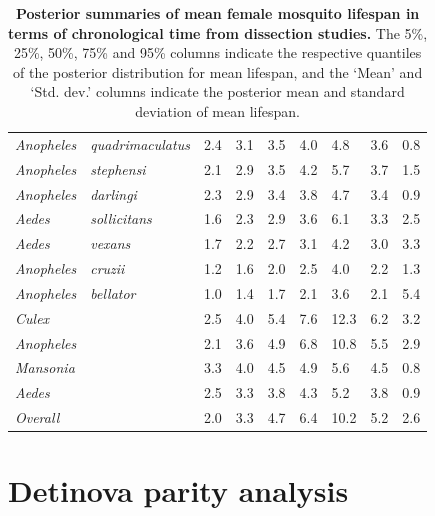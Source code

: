 \documentclass[12pt]{article}
\begin{document}
\begin{table}[htbp!]
\begin{tabular}{l|l|l|l|l|l|l|l|l}
	\textit{Anopheles} & \textit{quadrimaculatus} & 2.4 & 3.1 & 3.5 & 4.0 & 4.8 & 3.6 & 0.8 \\
	\textit{Anopheles} & \textit{stephensi} & 2.1 & 2.9 & 3.5 & 4.2 & 5.7 & 3.7 & 1.5 \\
	\textit{Anopheles} & \textit{darlingi} & 2.3 & 2.9 & 3.4 & 3.8 & 4.7 & 3.4 & 0.9 \\
	\textit{Aedes} & \textit{sollicitans} & 1.6 & 2.3 & 2.9 & 3.6 & 6.1 & 3.3 & 2.5 \\
	\textit{Aedes} & \textit{vexans} & 1.7 & 2.2 & 2.7 & 3.1 & 4.2 & 3.0 & 3.3 \\
	\textit{Anopheles} & \textit{cruzii} & 1.2 & 1.6 & 2.0 & 2.5 & 4.0 & 2.2 & 1.3 \\
	\textit{Anopheles} & \textit{bellator} & 1.0 & 1.4 & 1.7 & 2.1 & 3.6 & 2.1 & 5.4 \\
		\hline
		\textit{Culex} & \textit{} & 2.5 & 4.0 & 5.4 & 7.6 & 12.3 & 6.2 & 3.2 \\
		\textit{Anopheles} & \textit{} & 2.1 & 3.6 & 4.9 & 6.8 & 10.8 & 5.5 & 2.9 \\
		\textit{Mansonia} & \textit{} & 3.3 & 4.0 & 4.5 & 4.9 & 5.6 & 4.5 & 0.8 \\
		\textit{Aedes} & \textit{} & 2.5 & 3.3 & 3.8 & 4.3 & 5.2 & 3.8 & 0.9 \\
		\hline
		\textit{Overall} & \textit{} & 2.0 & 3.3 & 4.7 & 6.4 & 10.2 & 5.2 & 2.6 \\
	\end{tabular}
	\caption{\textbf{Posterior summaries of mean female mosquito lifespan in terms of chronological time from dissection studies.} The 5\%, 25\%, 50\%, 75\% and 95\% columns indicate the respective quantiles of the posterior distribution for mean lifespan, and the `Mean' and `Std. dev.' columns indicate the posterior mean and standard deviation of mean lifespan.}
	\label{tab:dissection_estimated_lifespans_chron}%
\end{table}

\section{Detinova parity analysis}
\end{document}
